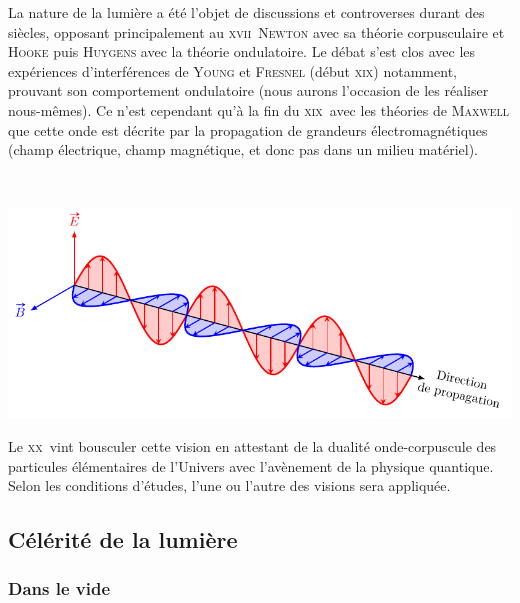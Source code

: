 \documentclass[../../main/main.tex]{subfiles}
\begin{document}
\noindent
\begin{minipage}[t]{.48\linewidth}
	La nature de la lumière a été l'objet de discussions et controverses durant
	des siècles, opposant principalement au \textsc{xvii}\ieme\ \textsc{Newton}
	avec sa théorie corpusculaire et \textsc{Hooke} puis \textsc{Huygens} avec la
	théorie ondulatoire. Le débat s'est clos avec les expériences d'interférences
	de \textsc{Young} et \textsc{Fresnel} (début \textsc{xix}\ieme) notamment,
	prouvant son comportement ondulatoire (nous aurons l'occasion de les réaliser
	nous-mêmes).
	\smallbreak
	Ce n'est cependant qu'à la fin du \textsc{xix}\ieme\ avec les théories
	de \textsc{Maxwell} que cette onde est décrite par la propagation de grandeurs
	électromagnétiques (champ électrique, champ magnétique, et donc pas dans un
	milieu matériel).
\end{minipage}
\hfill
\begin{minipage}[t]{.48\linewidth}
	~
	\vspace*{-20pt}
	\begin{center}
		\includegraphics[width=\linewidth]{propagation}
		\label{fig:proplum}
	\end{center}
\end{minipage}
\bigbreak
Le \textsc{xx}\ieme\ vint bousculer cette vision en attestant de la dualité
onde-corpuscule des particules élémentaires de l'Univers avec l'avènement de la
physique quantique. Selon les conditions d'études, l'une ou l'autre des visions
sera appliquée.

\subsection{Célérité de la lumière}

\subsubsection{Dans le vide}
\end{document}
